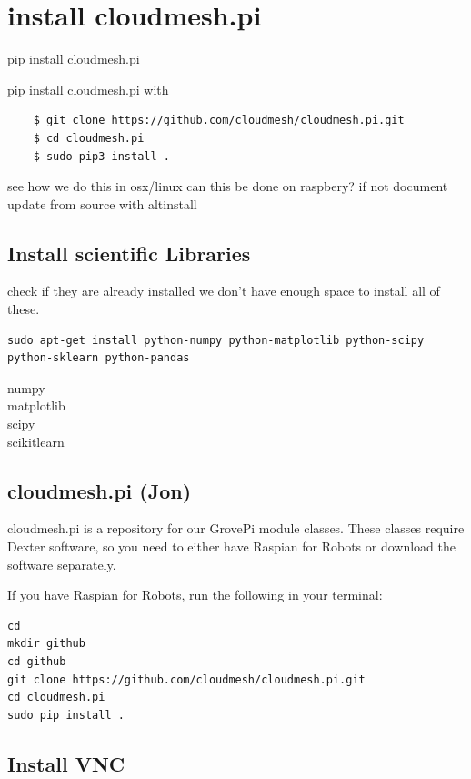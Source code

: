 \section{install cloudmesh.pi}\label{install-cloudmesh.pi}

pip install cloudmesh.pi

pip install cloudmesh.pi with

\begin{verbatim}
    $ git clone https://github.com/cloudmesh/cloudmesh.pi.git
    $ cd cloudmesh.pi
    $ sudo pip3 install .
\end{verbatim}

see how we do this in osx/linux can this be done on raspbery? if not
document update from source with altinstall

\subsection{Install scientific
Libraries}\label{install-scientific-libraries}

check if they are already installed we don't have enough space to
install all of these.

\begin{verbatim}
sudo apt-get install python-numpy python-matplotlib python-scipy python-sklearn python-pandas
\end{verbatim}

numpy\\
matplotlib\\
scipy\\
scikitlearn

\subsection{cloudmesh.pi (Jon)}\label{cloudmesh.pi-jon}

cloudmesh.pi is a repository for our GrovePi module classes. These
classes require Dexter software, so you need to either have Raspian for
Robots or download the software separately.

If you have Raspian for Robots, run the following in your terminal:

\begin{verbatim}
cd
mkdir github
cd github
git clone https://github.com/cloudmesh/cloudmesh.pi.git
cd cloudmesh.pi
sudo pip install .
\end{verbatim}

\subsection{Install VNC}\label{install-vnc}


